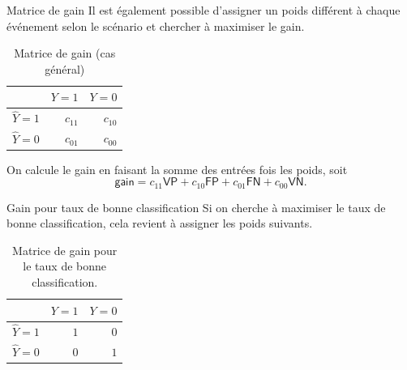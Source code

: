 \documentclass[
  ignorenonframetext,
]{beamer}
\begin{document}
\begin{frame}{Matrice de gain}
\protect\hypertarget{matrice-de-gain}{}
Il est également possible d'assigner un poids différent à chaque
événement selon le scénario et chercher à maximiser le gain.

\hypertarget{tbl-tableconfumat4}{}
\begin{table}
\caption{\label{tbl-tableconfumat4}Matrice de gain (cas général) }\tabularnewline

\centering
\begin{tabular}{lrr}
\toprule
  & \(Y=1\) & \(Y=0\)\\
\midrule
\(\widehat{Y}=1\) & $c_{11}$ & $c_{10}$\\
\(\widehat{Y}=0\) & $c_{01}$ & $c_{00}$\\
\bottomrule
\end{tabular}
\end{table}

On calcule le gain en faisant la somme des entrées fois les poids, soit
\[\textsf{gain} = c_{11}\mathsf{VP} + c_{10}\mathsf{FP} + c_{01}\mathsf{FN} + c_{00}\mathsf{VN}.\]
\end{frame}

\begin{frame}{Gain pour taux de bonne classification}
\protect\hypertarget{gain-pour-taux-de-bonne-classification}{}
Si on cherche à maximiser le taux de bonne classification, cela revient
à assigner les poids suivants.

\hypertarget{tbl-tableconfumat3}{}
\begin{table}
\caption{\label{tbl-tableconfumat3}Matrice de gain pour le taux de bonne classification. }\tabularnewline

\centering
\begin{tabular}{lrr}
\toprule
  & \(Y=1\) & \(Y=0\)\\
\midrule
\(\widehat{Y}=1\) & $1$ & $0$\\
\(\widehat{Y}=0\) & $0$ & $1$\\
\bottomrule
\end{tabular}
\end{table}
\end{frame}
\end{document}
